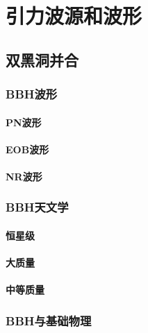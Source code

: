 
\chapter{引力波源和波形}
\label{chap3}

\section{双黑洞并合}
\subsection{BBH波形}
\subsubsection{PN波形}
\subsubsection{EOB波形}
\subsubsection{NR波形}
\subsection{BBH天文学}
\subsubsection{恒星级}
\subsubsection{大质量}
\subsubsection{中等质量}
\subsection{BBH与基础物理}
